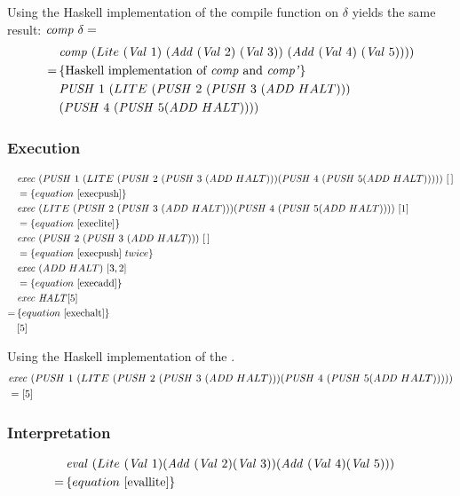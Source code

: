 \documentclass {article}
\begin{document}
Using the Haskell implementation 
of the compile function on $\delta$
yields the same result: \( \mathit{comp\ } \delta = \)
\begin{align*}
&\Comp (Lite\ (\Val 1)\
		 (\Add (\Val 2)\ (\Val 3))\ 
		(\Add (\Val 4)\ (\Val 5)))) \\
=\, & \{ \mbox{Haskell implementation of \comp\ and \compp} \} \\
&\PUSH 1\ (LITE\ (\PUSH 2\ (\PUSH 3\ (\ADD  HALT))) \\
		&(\PUSH 4\ (\PUSH 5 (\ADD  HALT))))
\end{align*}

\subsubsection{Execution}

\begin{align*}
&\Exec (\PUSH 1\ (LITE\ (\PUSH 2\ (\PUSH 3\ (\ADD  HALT))) (\PUSH 4\ (\PUSH 5 (\ADD  HALT)))))\ [\, ] \\
&=\{equation\ \ref{execpush} \} \\
&\Exec (LITE\ (\PUSH 2\ (\PUSH 3\ (\ADD  HALT))) (\PUSH 4\ (\PUSH 5 (\ADD  HALT))))\ [1] \\
&=\{equation\ \ref{execlite} \} \\
&\Exec (\PUSH 2\ (\PUSH 3\ (\ADD  HALT)))\ [\, ] \\
&=\{equation\ \ref{execpush}\ twice \} \\
&\Exec (\ADD  HALT)\ [3, 2] \\
&=\{equation\ \ref{execadd} \} \\
&\Exec \HALT [5] \\
=\, & \{equation\ \ref{exechalt}\} \\
&[5]
\end{align*}

Using the Haskell implementation of the \vm.
\begin{align*}	
&\Exec (\PUSH 1\ (LITE\ 
	(\PUSH 2\ (\PUSH 3\ (\ADD  HALT))) 
	(\PUSH 4\ (\PUSH 5 (\ADD  HALT))))) \\
&= [5]
\end{align*}

\subsubsection{Interpretation}

\begin{align*}
&\mathit{eval\ }  (Lite\ (\mathit{Val\ } 1) 
		(\mathit{Add\ } (\mathit{Val\ } 2) (\mathit{Val\ } 3)) 
		(\mathit{Add\ } (\mathit{Val\ } 4) (\mathit{Val\ } 5))) \\
=\, & \{ equation\ \ref{evallite} \}
&
\end{align*}
\end{document}
